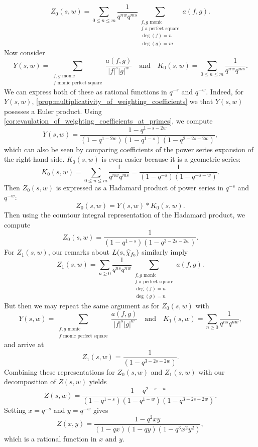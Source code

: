 \documentclass[12pt,reqno,oneside]{amsart}
\begin{document}
    \[
        Z_{0}(s,w) = \sum_{0 \le n \le m}\frac{1}{q^{nw}q^{ms}}\sum_{\substack{\text{$f,g$ monic} \\ \text{$f$ a perfect square} \\ \deg(f) = n \\ \deg(g) = m}}a(f,g).
    \]
    Now consider
    \[
        Y(s,w) = \sum_{\substack{\text{$f,g$ monic} \\ \text{$f$ monic perfect square}}}\frac{a(f,g)}{|f|^{s}|g|^{w}} \quad \text{and} \quad K_{0}(s,w) = \sum_{0 \le n \le m}\frac{1}{q^{nw}q^{ms}}.
    \]
    We can express both of these as rational functions in $q^{-s}$ and $q^{-w}$. Indeed, for $Y(s,w)$, \cref{prop:multiplicativity_of_weighting_coefficients}  we that $Y(s,w)$ posesses a Euler product. Using \cref{cor:evaulation_of_weighting_coefficients_at_primes}, we compute
    \[
        Y(s,w) = \frac{1-q^{1-s-2w}}{(1-q^{1-2w})(1-q^{1-s})(1-q^{2-2s-2w})},
    \]
    which can also be seen by comparing coefficients of the power series expansion of the right-hand side. $K_{0}(s,w)$ is even easier because it is a geometric series:
    \[
        K_{0}(s,w) = \sum_{0 \le n \le m}\frac{1}{q^{nw}q^{ms}} = \frac{1}{(1-q^{-s})(1-q^{-s-w})}.
    \]
    Then $Z_{0}(s,w)$ is expressed as a Hadamard product of power series in $q^{-s}$ and $q^{-w}$:
    \[
        Z_{0}(s,w) = Y(s,w) \ast K_{0}(s,w).
    \]
    Then using the countour integral representation of the Hadamard product, we compute
    \[
        Z_{0}(s,w) = \frac{1}{(1-q^{1-s})(1-q^{3-2s-2w})}.
    \]
    For $Z_{1}(s,w)$, our remarks about $L(s,\widehat{\chi}_{f_{0}})$ similarly imply
    \[
        Z_{1}(s,w) = \sum_{n \ge 0}\frac{1}{q^{ns}q^{nw}}\sum_{\substack{\text{$f,g$ monic} \\ \text{$f$ a perfect square} \\ \deg(f) = n \\ \deg(g) = n}}a(f,g).
    \]
    But then we may repeat the same argument as for $Z_{0}(s,w)$ with
    \[
        Y(s,w) = \sum_{\substack{\text{$f,g$ monic} \\ \text{$f$ monic perfect square}}}\frac{a(f,g)}{|f|^{s}|g|^{w}} \quad \text{and} \quad K_{1}(s,w) = \sum_{n \ge 0}\frac{1}{q^{ns}q^{nw}},
    \]
    and arrive at
    \[
        Z_{1}(s,w) = \frac{1}{(1-q^{3-2s-2w})}.
    \]
    Combining these representations for $Z_{0}(s,w)$ and $Z_{1}(s,w)$ with our decomposition of $Z(s,w)$ yields
    \[
        Z(s,w) = \frac{1-q^{2-s-w}}{(1-q^{1-s})(1-q^{1-w})(1-q^{3-2s-2w})}.
    \]
    Setting $x = q^{-s}$ and $y = q^{-w}$ gives
    \[
        Z(x,y) = \frac{1-q^{2}xy}{(1-qx)(1-qy)(1-q^{3}x^{2}y^{2})},
    \]
    which is a rational function in $x$ and $y$.
\end{document}
